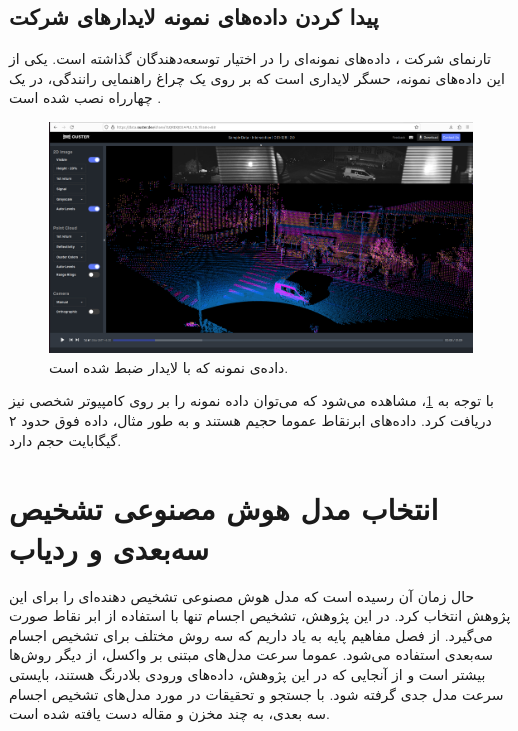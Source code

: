 \subsection{پیدا کردن داده‌های نمونه لایدارهای شرکت }
تارنمای شرکت ، داده‌های نمونه‌ای را در اختیار توسعه‌دهندگان گذاشته است. یکی از این داده‌های نمونه، حسگر لایداری است که بر روی یک چراغ راهنمایی رانندگی، در یک چهارراه نصب شده است . 

\begin{figure}[h!]
    \centering
    \includegraphics[width=1\linewidth]{figures/Ouster_Sample_Data_Intersection.png}
    \caption{داده‌ی نمونه که با لایدار  ضبط شده است.}
    \label{fig:Ouster_Sample_Data_Intersection}
\end{figure}

با توجه به \cref{fig:Ouster_Sample_Data_Intersection}، مشاهده می‌شود که می‌توان داده‌‌ نمونه را بر روی کامپیوتر شخصی نیز دریافت کرد. داده‌های ابرنقاط عموما حجیم هستند و به طور مثال، داده فوق حدود ۲ گیگابایت حجم دارد. 

\section{انتخاب مدل هوش مصنوعی تشخیص سه‌بعدی و ردیاب}
حال زمان آن رسیده است که مدل هوش مصنوعی‌ تشخیص دهنده‌ای را برای این پژوهش انتخاب کرد. در این پژوهش، تشخیص اجسام تنها با استفاده از ابر نقاط صورت می‌گیرد. از فصل مفاهیم پایه به یاد داریم که سه روش مختلف برای تشخیص اجسام سه‌بعدی استفاده می‌شود. عموما سرعت مدل‌های مبتنی بر واکسل، از دیگر روش‌ها بیشتر است و از آنجایی که در این پژوهش، داده‌های ورودی بلادرنگ هستند، بایستی سرعت مدل جدی گرفته شود. با جستجو و تحقیقات در مورد مدل‌های تشخیص اجسام سه بعدی، به چند مخزن و مقاله دست‌ یافته شده است.

